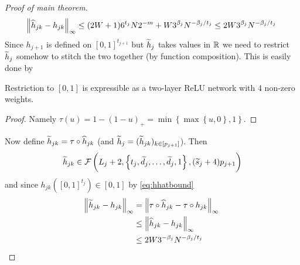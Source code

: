 \begin{proof}[Proof of main theorem]
\begin{equation}
    \norm{\widehat{h}_{jk} - h_{jk}}_\infty \leq (2 W + 1) 6^{t_j} N 2^{-m}
    + W 3^{\beta_j} N^{-\beta_j/t_j} \leq 2 W 3^{\beta_j} N^{-\beta_j/t_j}
    \label{eq:hhatbound}
  \end{equation} 
  Since $h_{j+1}$ is defined on $[0, 1]^{t_{j+1}}$ but $\widetilde{h}_j$ takes values
  in $\mathbb{R}$ we need to restrict $\widetilde{h}_j$ somehow to stitch
  the two together (by function composition). This is easily done by
  \begin{lem}
    Restriction to $[0, 1]$ is expressible as a two-layer ReLU network
    with 4 non-zero weights.
  \end{lem}
  \begin{proof}
    Namely $\tau(u) = 1 - (1 - u)_+ = \min \left\{
    \max \left\{ u, 0 \right\}, 1 \right\}$. %
  \end{proof}
  Now define
  $\widetilde{h}_{jk} = \tau \circ \widehat{h}_{jk}$
  (and $\widetilde{h}_{j} = (\widetilde{h}_{jk})_{k \in [p_{j + 1}]}$).
  Then
  \begin{equation}
    \widetilde{h}_{jk} \in \mathcal{F}\left( L_j + 2, \left\{ t_j,
  \widetilde{d}_j, \dots, \widetilde{d}_j, 1 \right\}, (\widetilde{s}_j + 4) p_{j+1} \right)
  \end{equation}
  and since $h_{jk}([0, 1]^{t_j}) \in [0, 1]$ by \cref{eq:hhatbound}
  \begin{align}
    \norm{\widetilde{h}_{jk} - h_{jk}}_\infty
    = &\; \norm{\tau \circ \widehat{h}_{jk} - \tau \circ h_{jk}}_\infty
    \\ \leq &\; \norm{\widehat{h}_{jk} - h_{jk}}_\infty
    \\ \leq &\; 2 W 3^{-\beta_j} N^{-\beta_j/t_j}
  \end{align}


\end{proof}
